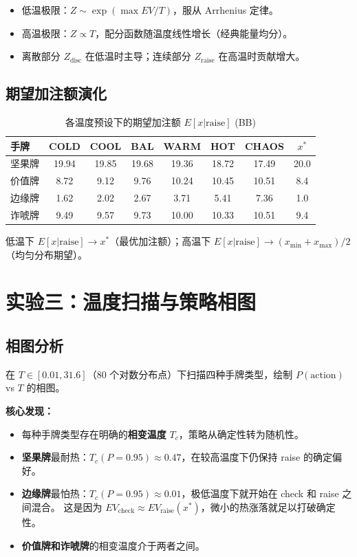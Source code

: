 \documentclass[12pt,a4paper]{ctexart}
\begin{document}
\begin{itemize}
    \item 低温极限：$Z \sim \exp(\max EV / T)$，服从 Arrhenius 定律。
    \item 高温极限：$Z \propto T$，配分函数随温度线性增长（经典能量均分）。
    \item 离散部分 $Z_{\text{disc}}$ 在低温时主导；连续部分 $Z_{\text{raise}}$ 在高温时贡献增大。
\end{itemize}

\subsection{期望加注额演化}

\begin{table}[H]
\centering
\caption{各温度预设下的期望加注额 $E[x|\text{raise}]$ (BB)}
\begin{tabular}{@{}lccccccc@{}}
\toprule
\textbf{手牌} & \textbf{COLD} & \textbf{COOL} & \textbf{BAL} & \textbf{WARM} & \textbf{HOT} & \textbf{CHAOS} & $x^*$ \\
\midrule
坚果牌  & 19.94 & 19.85 & 19.68 & 19.36 & 18.72 & 17.49 & 20.0 \\
价值牌  & 8.72  & 9.12  & 9.76  & 10.24 & 10.45 & 10.51 & 8.4  \\
边缘牌  & 1.62  & 2.02  & 2.67  & 3.71  & 5.41  & 7.36  & 1.0  \\
诈唬牌  & 9.49  & 9.57  & 9.73  & 10.00 & 10.33 & 10.51 & 9.4  \\
\bottomrule
\end{tabular}
\end{table}

低温下 $E[x|\text{raise}] \to x^*$（最优加注额）；高温下 $E[x|\text{raise}] \to (x_{\min}+x_{\max})/2$（均匀分布期望）。

\section{实验三：温度扫描与策略相图}

\subsection{相图分析}

在 $T \in [0.01, 31.6]$（80 个对数分布点）下扫描四种手牌类型，绘制 $P(\text{action})$ vs $T$ 的相图。

\textbf{核心发现：}
\begin{itemize}
    \item 每种手牌类型存在明确的\textbf{相变温度} $T_c$，策略从确定性转为随机性。
    \item \textbf{坚果牌}最耐热：$T_c(P=0.95) \approx 0.47$，在较高温度下仍保持 raise 的确定偏好。
    \item \textbf{边缘牌}最怕热：$T_c(P=0.95) \approx 0.01$，极低温度下就开始在 check 和 raise 之间混合。
          这是因为 $EV_{\text{check}} \approx EV_{\text{raise}}(x^*)$，微小的热涨落就足以打破确定性。
    \item \textbf{价值牌和诈唬牌}的相变温度介于两者之间。
\end{itemize}
\end{document}
